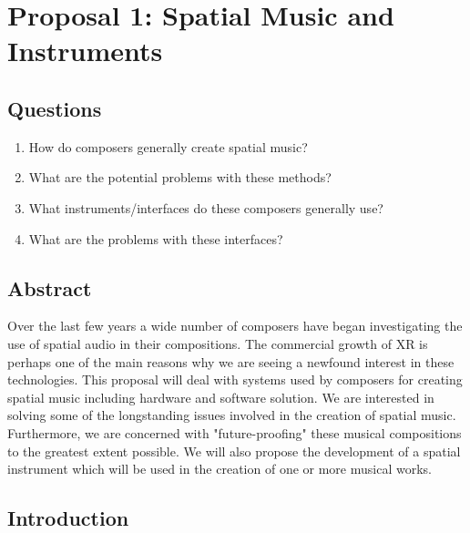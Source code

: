 \chapter{Proposal 1: Spatial Music and Instruments}



\section{Questions}
\begin{enumerate}
    \item How do composers generally create spatial music? 
    \item What are the potential problems with these methods?
    \item What instruments/interfaces do these composers generally use?
    \item What are the problems with these interfaces?
\end{enumerate}

\section{Abstract}
Over the last few years a wide number of composers have began investigating the use of spatial audio in their compositions. The commercial growth of XR is perhaps one of the main reasons why we are seeing a newfound interest in these technologies. This proposal will deal with systems used by composers for creating spatial music including hardware and software solution. We are interested in solving some of the longstanding issues involved in the creation of spatial music. Furthermore, we are concerned with "future-proofing" these musical compositions to the greatest extent possible. We will also propose the development of a spatial instrument which will be used in the creation of one or more musical works.

\section{Introduction}

